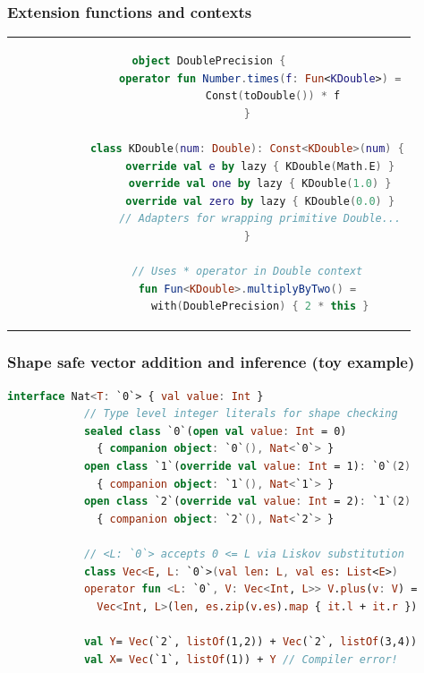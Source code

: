 \documentclass{beamer}
\begin{document}
    \begin{frame}[fragile]
        \frametitle{Extension functions and contexts}
\begin{center}
\begin{tabular}{c}
        \begin{lstlisting}[language=Kotlin, gobble=12]
            object DoublePrecision {
                operator fun Number.times(f: Fun<KDouble>) =
                    Const(toDouble()) * f
            }

            class KDouble(num: Double): Const<KDouble>(num) {
                override val e by lazy { KDouble(Math.E) }
                override val one by lazy { KDouble(1.0) }
                override val zero by lazy { KDouble(0.0) }
                // Adapters for wrapping primitive Double...
            }

            // Uses * operator in Double context
            fun Fun<KDouble>.multiplyByTwo() =
                with(DoublePrecision) { 2 * this }
        \end{lstlisting}
\end{tabular}
\end{center}
    \end{frame}


    \begin{frame}[fragile]
        \frametitle{Shape safe vector addition and inference (toy example)}
        \begin{lstlisting}[language=Kotlin, gobble=12, style=backtickstyle]
            interface Nat<T: `0`> { val value: Int }
            // Type level integer literals for shape checking
            sealed class `0`(open val value: Int = 0)
              { companion object: `0`(), Nat<`0`> }
            open class `1`(override val value: Int = 1): `0`(2)
              { companion object: `1`(), Nat<`1`> }
            open class `2`(override val value: Int = 2): `1`(2)
              { companion object: `2`(), Nat<`2`> }

            // <L: `0`> accepts 0 <= L via Liskov substitution
            class Vec<E, L: `0`>(val len: L, val es: List<E>)
            operator fun <L: `0`, V: Vec<Int, L>> V.plus(v: V) =
              Vec<Int, L>(len, es.zip(v.es).map { it.l + it.r })

            val Y= Vec(`2`, listOf(1,2)) + Vec(`2`, listOf(3,4))
            val X= Vec(`1`, listOf(1)) + Y // Compiler error!
        \end{lstlisting}
    \end{frame}
\end{document}
